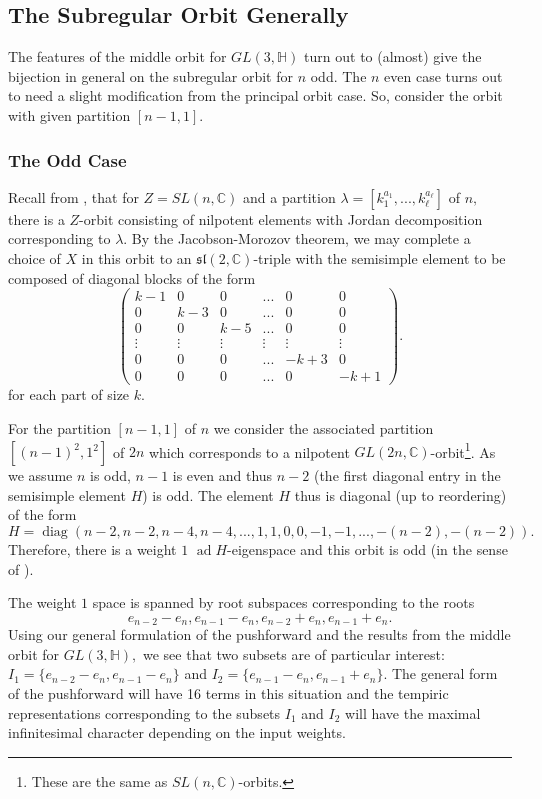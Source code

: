 \documentclass[letterpaper,twosided,11pt]{article}
\theoremstyle{plain}
\theoremstyle{definition}
\theoremstyle{remark}
\newcommand{\C}{\mathbb{C}}
\newcommand{\HH}{\mathbb{H}}
\newcommand{\Mat}[1]{\begin{pmatrix}#1\end{pmatrix}}
\newcommand{\lie}[1]{\mathfrak{#1}}
\newcommand{\ad}{\operatorname{ad}}
\begin{document}
\subsection{The Subregular Orbit Generally}
The features of the middle orbit for $GL(3,\HH)$ turn out to (almost) give the bijection 
in general on the subregular orbit for $n$ odd. The $n$ even case turns out to
 need a slight modification from the principal orbit case. 
So, consider the orbit with given partition $[n-1,1].$ 

\subsubsection{The Odd Case} 
Recall from \cite{Collingwood1993}, that for $Z=SL(n,\C)$ and a
 partition $\lambda=[k_1^{a_1},...,k_\ell^{a_\ell}]$ of $n,$ there is a $Z$-orbit consisting of nilpotent elements
  with Jordan decomposition corresponding to $\lambda.$ By the Jacobson-Morozov theorem, we may 
  complete a choice of $X$ in this orbit to an $\lie{sl}(2,\C)$-triple with the semisimple
element to be composed of diagonal blocks of the form 
\[ \Mat{k-1 & 0 & 0 &... & 0 & 0\\
	0 & k-3 & 0 & ... & 0 & 0 \\
	0 & 0 & k-5 & ... & 0 & 0 \\
	\vdots  & \vdots & \vdots & \vdots & \vdots & \vdots \\
	0 & 0 &0 & ... & -k+3 & 0 \\
	0 & 0 & 0 & ... & 0 & -k+1 }.\] 
for each part of size $k.$ 

For the partition $[n-1,1]$ of $n$ we consider the associated partition $[(n-1)^2,1^2]$ of $2n$
 which corresponds to a nilpotent $GL(2n,\C)$-orbit\footnote{These are the same as $SL(n,\C)$-orbits.}. 
 As we assume $n$ is odd, $n-1$ is even and thus $n-2$ (the first diagonal entry in the semisimple 
 element $H$) is odd. The element $H$ thus is diagonal (up to reordering) of 
 the form \[ H=\operatorname{diag}(n-2,n-2,n-4, n-4,...,1,1,0,0,-1,-1,...,-(n-2),-(n-2)).      \]
 Therefore, there is a weight $1$ $\ad H$-eigenspace and this orbit is odd (in the sense of \cite{Collingwood1993}). 
 
The weight $1$ space is spanned by root subspaces corresponding to the
 roots \[e_{n-2}-e_n, e_{n-1}-e_n,e_{n-2}+e_n,e_{n-1}+e_n.\]  Using our
  general formulation of the pushforward and the results from the middle orbit 
  for $GL(3,\HH),$ we see that two subsets are of particular interest: $I_1=\{e_{n-2}-e_{n},e_{n-1}-e_n\}$ and 
  $I_2=\{e_{n-1}-e_n,e_{n-1}+e_n\}.$ The general form of the pushforward will have 16 terms in this situation 
  and the tempiric representations corresponding to the subsets $I_1$ and $I_2$ will have the maximal 
  infinitesimal character depending on the input weights. 
  
\end{document}
